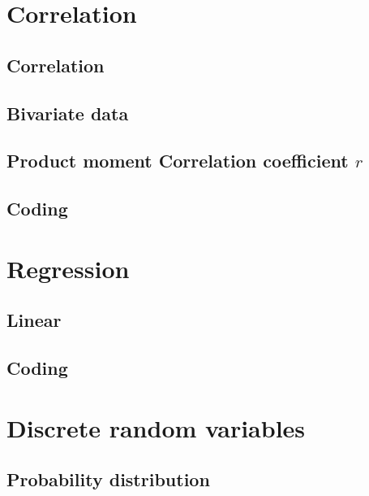 \documentclass[a4paper]{article}
\begin{document}
\begin{defi}

\end{defi}

\begin{defi}

\end{defi}
\section{Correlation}
\subsection{Correlation}
\subsection{Bivariate data}
\begin{defi}[Co-Variance]

\end{defi}

\subsection{Product moment Correlation coefficient $r$}

\subsection{Coding}

\section{Regression}
\subsection{Linear}
\subsection{Coding}

\section{Discrete random variables}
\subsection{Probability distribution}
\end{document}
